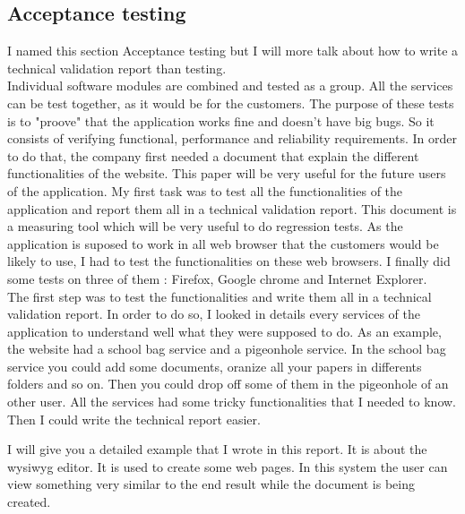 \newpage
\subsection{Acceptance testing}
I named this section Acceptance testing but I will more talk about how to 
write a technical validation report than testing. \\ 

Individual software modules are combined and tested as a group. All the services can be test
together, as it would be for the customers. 
The purpose of these tests is to "proove" that the application works fine and doesn't have
big bugs. So it consists of verifying functional, performance and reliability requirements. 
In order to do that, the company first needed a document that explain the different 
functionalities of the website. This paper will be very useful for the future users of the 
application.  
My first task was to test all the functionalities of the application and report them all in a technical validation report. This document is a measuring tool
which will be very useful to do regression tests. 
As the application is suposed to work in all web browser that the customers
would be likely to use, I had to test the functionalities on these web
browsers. I finally did some tests on three of them : Firefox, Google chrome and
Internet Explorer. \\ 

The first step was to test the functionalities and write them all in a technical validation
 report. In order to do so, I looked in details every services of the application to 
understand well what they were supposed to do. 
As an example, the website had a school bag service and a pigeonhole service.
In the school bag service you could add some documents, oranize all your papers in
differents folders and so on. Then you could drop off some of them in the pigeonhole of an
other user.
All the services had some tricky functionalities that I needed to know. Then I could write
the technical report easier. 
   
I will give you a detailed example that I wrote in this report. 
It is about the wysiwyg editor. It is used to create some web pages. In this system
the user can view something very 
similar to the end result while the document is being created.  \\ 

